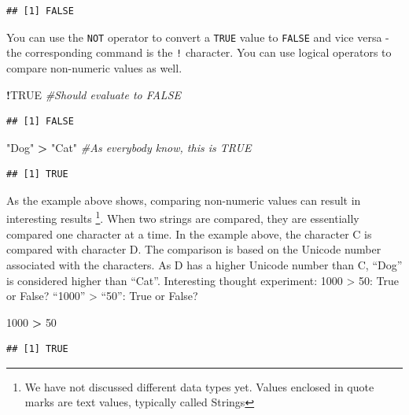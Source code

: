\documentclass[]{krantz}
\makeatletter
\newenvironment{Shaded}{\begin{snugshade}}{\end{snugshade}}
\newcommand{\DecValTok}[1]{\textcolor[rgb]{0.06,0.06,0.06}{#1}}
\newcommand{\StringTok}[1]{\textcolor[rgb]{0.5,0.5,0.5}{#1}}
\newcommand{\CommentTok}[1]{\textcolor[rgb]{0.56,0.35,0.01}{\textit{#1}}}
\newcommand{\OtherTok}[1]{\textcolor[rgb]{0.56,0.35,0.01}{#1}}
\newcommand{\OperatorTok}[1]{\textcolor[rgb]{0.81,0.36,0.00}{\textbf{#1}}}
\newenvironment{kframe}{%
\medskip{}
\setlength{\fboxsep}{.8em}
 \def\at@end@of@kframe{}%
 \ifinner\ifhmode%
  \def\at@end@of@kframe{\end{minipage}}%
  \begin{minipage}{\columnwidth}%
 \fi\fi%
 \def\FrameCommand##1{\hskip\@totalleftmargin \hskip-\fboxsep
 \colorbox{shadecolor}{##1}\hskip-\fboxsep
     \hskip-\linewidth \hskip-\@totalleftmargin \hskip\columnwidth}%
 \MakeFramed {\advance\hsize-\width
   \@totalleftmargin\z@ \linewidth\hsize
   \@setminipage}}%
 {\par\unskip\endMakeFramed%
 \at@end@of@kframe}
\renewenvironment{Shaded}{\begin{kframe}}{\end{kframe}}
\theoremstyle{definition}
\theoremstyle{definition}
\theoremstyle{definition}
\theoremstyle{remark}
\makeatother
\begin{document}
\begin{verbatim}
## [1] FALSE
\end{verbatim}

You can use the \texttt{NOT} operator to convert a \texttt{TRUE} value
to \texttt{FALSE} and vice versa - the corresponding command is the
\texttt{!} character. You can use logical operators to compare
non-numeric values as well.

\begin{Shaded}
\begin{Highlighting}[]
\OperatorTok{!}\OtherTok{TRUE} \CommentTok{#Should evaluate to FALSE}
\end{Highlighting}
\end{Shaded}

\begin{verbatim}
## [1] FALSE
\end{verbatim}

\begin{Shaded}
\begin{Highlighting}[]
\StringTok{"Dog"} \OperatorTok{>}\StringTok{ "Cat"} \CommentTok{#As everybody know, this is TRUE}
\end{Highlighting}
\end{Shaded}

\begin{verbatim}
## [1] TRUE
\end{verbatim}

As the example above shows, comparing non-numeric values can result in
interesting results \footnote{We have not discussed different data types
  yet. Values enclosed in quote marks are text values, typically called
  Strings}. When two strings are compared, they are essentially compared
one character at a time. In the example above, the character C is
compared with character D. The comparison is based on the Unicode number
associated with the characters. As D has a higher Unicode number than C,
``Dog'' is considered higher than ``Cat''. Interesting thought
experiment: 1000 \textgreater{} 50: True or False? ``1000''
\textgreater{} ``50'': True or False?

\begin{Shaded}
\begin{Highlighting}[]
\DecValTok{1000} \OperatorTok{>}\StringTok{ }\DecValTok{50}
\end{Highlighting}
\end{Shaded}

\begin{verbatim}
## [1] TRUE
\end{verbatim}
\end{document}
